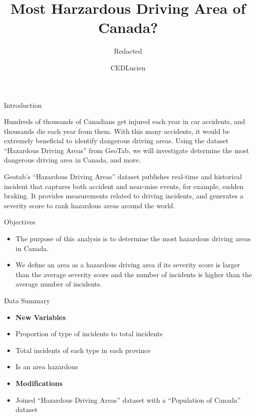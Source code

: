 \documentclass[ignorenonframetext,]{beamer}
\title{Most Harzardous Driving Area of Canada?}
\subtitle{Redacted}
\author{CEDLucien}
\date{}
\providecommand{\tightlist}{%
  \setlength{\itemsep}{0pt}\setlength{\parskip}{0pt}}
\begin{document}
\frame{\titlepage}

\begin{frame}{Introduction}

Hundreds of thousands of Canadians get injured each year in car
accidents, and thousands die each year from them. With this many
accidents, it would be extremely beneficial to identify dangerous
driving areas. Using the dataset ``Hazardous Driving Areas'' from
GeoTab, we will investigate determine the most dangerous driving area in
Canada, and more.

Geotab's ``Hazardous Driving Areas'' dataset publishes real-time and
historical incident that captures both accident and near-miss events,
for example, sudden braking. It provides measurements related to driving
incidents, and generates a severity score to rank hazardous areas around
the world.

\end{frame}

\begin{frame}{Objectives}

\begin{itemize}
\tightlist
\item
  The purpose of this analysis is to determine the most hazardous
  driving areas in Canada.
\item
  We define an area as a hazardous driving area if its severity score is
  larger than the average severity score and the number of incidents is
  higher than the average number of incidents.
\end{itemize}

\end{frame}

\begin{frame}{Data Summary}

\begin{itemize}
\tightlist
\item
  \textbf{New Variables}
\item
  Proportion of type of incidents to total incidents
\item
  Total incidents of each type in each province
\item
  Is an area hazardous
\item
  \textbf{Modifications}
\item
  Joined ``Hazardous Driving Areas'' dataset with a ``Population of
  Canada'' dataset
\end{itemize}

\end{frame}
\end{document}

